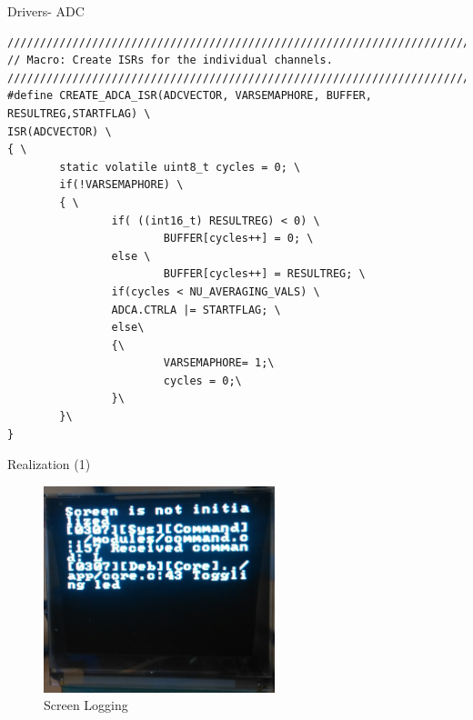 \documentclass[apectratio=169]{beamer}
\begin{document}
\begin{frame}[fragile]{Drivers- ADC}
\begin{verbatim}
/////////////////////////////////////////////////////////////////////////////////
// Macro: Create ISRs for the individual channels.
/////////////////////////////////////////////////////////////////////////////////
#define CREATE_ADCA_ISR(ADCVECTOR, VARSEMAPHORE, BUFFER, RESULTREG,STARTFLAG) \
ISR(ADCVECTOR) \
{ \
        static volatile uint8_t cycles = 0; \
        if(!VARSEMAPHORE) \
        { \
                if( ((int16_t) RESULTREG) < 0) \
                        BUFFER[cycles++] = 0; \
                else \
                        BUFFER[cycles++] = RESULTREG; \
                if(cycles < NU_AVERAGING_VALS) \
                ADCA.CTRLA |= STARTFLAG; \
                else\
                {\
                        VARSEMAPHORE= 1;\
                        cycles = 0;\
                }\
        }\
}

\end{verbatim}
\end{frame}
	\begin{frame}{Realization (1)}
	\begin{figure}
        	\centering
                \includegraphics[width=0.6\textwidth]{./fig/screen_logger}
                \caption{Screen Logging}
        \end{figure}
	\end{frame}
\end{document}
